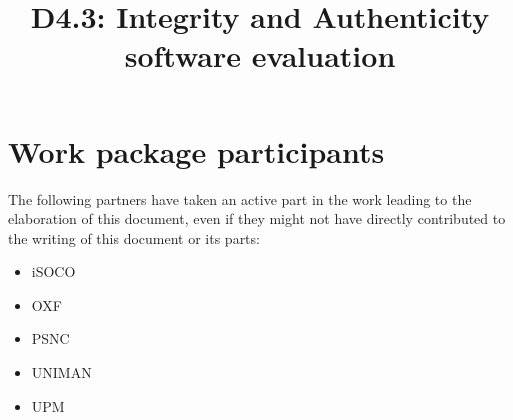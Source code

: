\documentclass[a4paper, twoside, 11pt]{article}
\title{D4.3: Integrity and Authenticity software evaluation}
\begin{document}
\maketitle

\section*{Work package participants} The following partners have taken an active part in the work leading to the elaboration of this document, even if they might not have directly contributed to the writing of this document or its parts: %
\begin{itemize}
\item iSOCO
\item OXF
\item PSNC
\item UNIMAN
\item UPM
\end{itemize}
\end{document}
